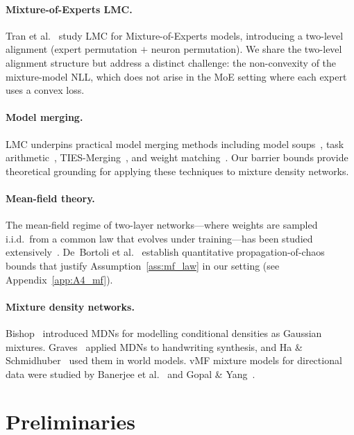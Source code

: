 \documentclass[11pt]{article}
\begin{document}
\paragraph{Mixture-of-Experts LMC.}
Tran et al.~\cite{tran2025moe} study LMC for Mixture-of-Experts models,
introducing a two-level alignment (expert permutation $+$ neuron
permutation).
We share the two-level alignment structure but address a distinct
challenge: the non-convexity of the mixture-model NLL, which does not
arise in the MoE setting where each expert uses a convex loss.

\paragraph{Model merging.}
LMC underpins practical model merging methods including model
soups~\cite{wortsman2022soups}, task
arithmetic~\cite{ilharco2023task}, TIES-Merging~\cite{yadav2023ties},
and weight matching~\cite{ainsworth2023}.
Our barrier bounds provide theoretical grounding for applying these
techniques to mixture density networks.

\paragraph{Mean-field theory.}
The mean-field regime of two-layer networks---where weights are sampled
i.i.d.\ from a common law that evolves under training---has been
studied extensively~\cite{mei2018meanfield,rotskoff2022}.
De~Bortoli et al.~\cite{debortoli2020} establish quantitative
propagation-of-chaos bounds that justify Assumption~\ref{ass:mf_law}
in our setting (see Appendix~\ref{app:A4_mf}).

\paragraph{Mixture density networks.}
Bishop~\cite{bishop1994} introduced MDNs for modelling conditional
densities as Gaussian mixtures.
Graves~\cite{graves2013} applied MDNs to handwriting synthesis, and
Ha \& Schmidhuber~\cite{ha2018worldmodels} used them in world models.
vMF mixture models for directional data were studied
by Banerjee et al.~\cite{banerjee2005} and Gopal \&
Yang~\cite{gopal2014}.

\section{Preliminaries}\label{sec:prelim}
\end{document}
